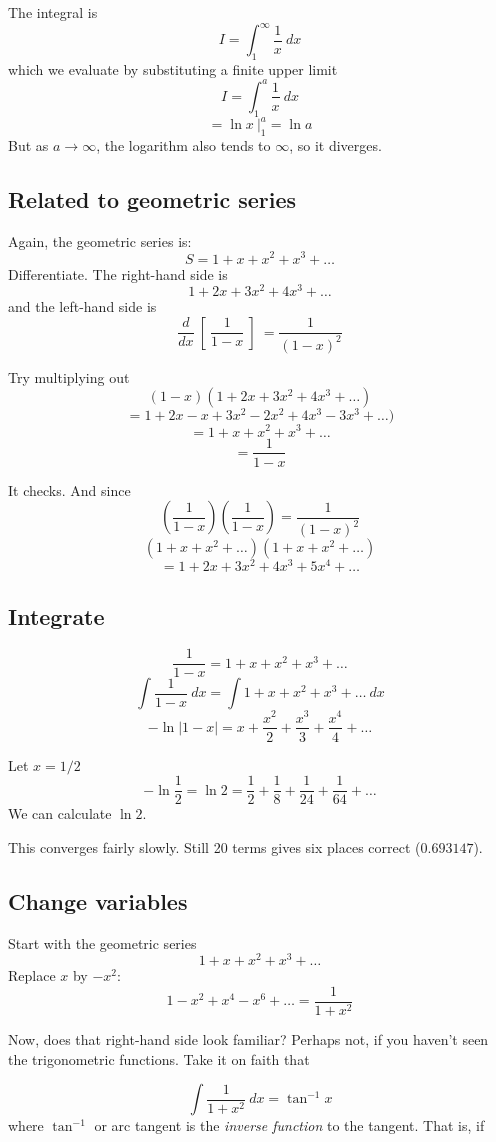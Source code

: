 \documentclass[11pt, oneside]{article}
\begin{document}
The integral is
\[ I = \int_1^{\infty} \frac{1}{x} \ dx \]
which we evaluate by substituting a finite upper limit
\[ I = \int_1^{a} \frac{1}{x} \ dx \]
\[ = \ln x \ \bigg |_1^a = \ln a \]
But as $a \rightarrow \infty$, the logarithm also tends to $\infty$, so it diverges.

\subsection*{Related to geometric series}
Again, the geometric series is:
\[    S = 1 + x + x^2 + x^3 + \dots \]
Differentiate.  The right-hand side is
\[ 1 + 2x + 3x^2 + 4x^3 + \dots \]
and the left-hand side is
\[ \frac{d}{dx} \ [ \ \frac{1}{1-x} \ ] \ = \frac{1}{(1-x)^2} \]

Try multiplying out
\[ (1-x) (1 + 2x + 3x^2 + 4x^3 + \dots ) \]
\[ = 1 + 2x - x + 3x^2 - 2x^2 + 4x^3 - 3x^3 +  \dots ) \]
\[ = 1 + x + x^2 + x^3 + \dots \]
\[ = \frac{1}{1-x} \]

It checks.  And since
\[    (\frac{1}{1-x})(\frac{1}{1-x}) = \frac{1}{(1-x)^2} \]
\[    (1 + x + x^2 + \dots) (1 + x + x^2 + \dots) \]
\[    = 1 + 2x + 3x^2 + 4x^3 + 5x^4 + \dots \]

\subsection*{Integrate}
\[    \frac{1}{1-x} = 1 + x + x^2 + x^3 + \dots \]
\[    \int \frac{1}{1-x} \ dx = \int 1 + x + x^2 + x^3 + \dots \ dx \]
\[     -\ln |1-x| = x + \frac{x^2}{2} + \frac{x^3}{3} + \frac{x^4}{4} + \dots \]

Let $x = 1/2$
\[ - \ln \frac{1}{2} = \ln 2 = \frac{1}{2} + \frac{1}{8} + \frac{1}{24} + \frac{1}{64} + \dots \]
We can calculate $\ln 2$.

This converges fairly slowly.  Still 20 terms gives six places correct ($0.693147$).

\subsection*{Change variables}
Start with the geometric series
\[    1 + x + x^2 + x^3 + \dots \]
Replace $x$ by $-x^2$:
\[    1 - x^2 + x^4 - x^6 + \dots = \frac{1}{1+x^2} \]

Now, does that right-hand side look familiar?  Perhaps not, if you haven't seen the trigonometric functions.  Take it on faith that

\[    \int \frac{1}{1+x^2} \ dx = \tan^{-1} x \]
where $ \tan^{-1}$ or arc tangent is the \emph{inverse function} to the tangent.  That is, if
\end{document}
